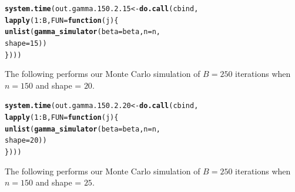 \documentclass[11pt]{article}\usepackage[]{graphicx}\usepackage[]{color}
\makeatletter
\newcommand{\hlnum}[1]{\textcolor[rgb]{0.686,0.059,0.569}{#1}}%
\newcommand{\hlopt}[1]{\textcolor[rgb]{0,0,0}{#1}}%
\newcommand{\hlstd}[1]{\textcolor[rgb]{0.345,0.345,0.345}{#1}}%
\newcommand{\hlkwa}[1]{\textcolor[rgb]{0.161,0.373,0.58}{\textbf{#1}}}%
\newcommand{\hlkwb}[1]{\textcolor[rgb]{0.69,0.353,0.396}{#1}}%
\newcommand{\hlkwc}[1]{\textcolor[rgb]{0.333,0.667,0.333}{#1}}%
\newcommand{\hlkwd}[1]{\textcolor[rgb]{0.737,0.353,0.396}{\textbf{#1}}}%
\newenvironment{kframe}{%
 \def\at@end@of@kframe{}%
 \ifinner\ifhmode%
  \def\at@end@of@kframe{\end{minipage}}%
  \begin{minipage}{\columnwidth}%
 \fi\fi%
 \def\FrameCommand##1{\hskip\@totalleftmargin \hskip-\fboxsep
 \colorbox{shadecolor}{##1}\hskip-\fboxsep
     \hskip-\linewidth \hskip-\@totalleftmargin \hskip\columnwidth}%
 \MakeFramed {\advance\hsize-\width
   \@totalleftmargin\z@ \linewidth\hsize
   \@setminipage}}%
 {\par\unskip\endMakeFramed%
 \at@end@of@kframe}
\newenvironment{knitrout}{}{} %
\makeatother
\begin{document}
\begin{knitrout}
\color{fgcolor}\begin{kframe}
\begin{alltt}
\hlkwd{system.time}\hlstd{(out.gamma.150.2.15} \hlkwb{<-} \hlkwd{do.call}\hlstd{(cbind,}
  \hlkwd{lapply}\hlstd{(}\hlnum{1}\hlopt{:}\hlstd{B,} \hlkwc{FUN} \hlstd{=} \hlkwa{function}\hlstd{(}\hlkwc{j}\hlstd{)\{}
    \hlkwd{unlist}\hlstd{(}\hlkwd{gamma_simulator}\hlstd{(}\hlkwc{beta} \hlstd{= beta,} \hlkwc{n} \hlstd{= n,}
      \hlkwc{shape} \hlstd{=} \hlnum{15}\hlstd{))}
\hlstd{\})))}
\end{alltt}


{\ttfamily\noindent\bfseries\color{errorcolor}{\#\# Error in r[, l]/mad.predict.fun(out.mad, xx): non-numeric argument to binary operator}}

{\ttfamily\noindent\itshape\color{messagecolor}{\#\# Timing stopped at: 1.728 0 1.728}}\end{kframe}
\end{knitrout}


The following performs our Monte Carlo simulation of $B = 250$ iterations 
when $n = 150$ and shape = $20$.

\begin{knitrout}
\color{fgcolor}\begin{kframe}
\begin{alltt}
\hlkwd{system.time}\hlstd{(out.gamma.150.2.20} \hlkwb{<-} \hlkwd{do.call}\hlstd{(cbind,}
  \hlkwd{lapply}\hlstd{(}\hlnum{1}\hlopt{:}\hlstd{B,} \hlkwc{FUN} \hlstd{=} \hlkwa{function}\hlstd{(}\hlkwc{j}\hlstd{)\{}
    \hlkwd{unlist}\hlstd{(}\hlkwd{gamma_simulator}\hlstd{(}\hlkwc{beta} \hlstd{= beta,} \hlkwc{n} \hlstd{= n,}
      \hlkwc{shape} \hlstd{=} \hlnum{20}\hlstd{))}
\hlstd{\})))}
\end{alltt}


{\ttfamily\noindent\bfseries\color{errorcolor}{\#\# Error in r[, l]/mad.predict.fun(out.mad, xx): non-numeric argument to binary operator}}

{\ttfamily\noindent\itshape\color{messagecolor}{\#\# Timing stopped at: 1.717 0 1.717}}\end{kframe}
\end{knitrout}


The following performs our Monte Carlo simulation of $B = 250$ iterations 
when $n = 150$ and shape = $25$.
\end{document}
